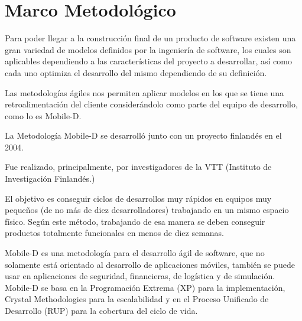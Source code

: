 
\chapter{Marco Metodológico} %

\label{MarcoMetodologico} %



Para poder llegar a la construcción final de un producto de software existen una gran variedad de modelos definidos por la ingeniería de software, los cuales son aplicables dependiendo a las características del proyecto a desarrollar, así como cada uno optimiza el desarrollo del mismo dependiendo de su definición. 

Las metodologías ágiles nos permiten aplicar modelos en los que se tiene una retroalimentación del cliente considerándolo como parte del equipo de desarrollo, como lo es Mobile-D.

La Metodología Mobile-D se desarrolló junto con un proyecto finlandés en el 2004.

Fue realizado, principalmente, por investigadores de la VTT (Instituto de Investigación Finlandés.)

El objetivo es conseguir ciclos de desarrollos muy rápidos en equipos muy pequeños (de no más de diez desarrolladores) trabajando en un mismo espacio físico. Según este método, trabajando de esa manera se deben conseguir productos totalmente funcionales en menos de diez semanas.

Mobile-D es una metodología para el desarrollo ágil de software, que no solamente está orientado al desarrollo de aplicaciones móviles, también se puede usar en aplicaciones de seguridad, financieras, de logística y de simulación.
Mobile-D se basa en la Programación Extrema (XP) para la implementación, Crystal Methodologies para la escalabilidad y en el Proceso Unificado de Desarrollo (RUP) para la cobertura del ciclo de vida.


